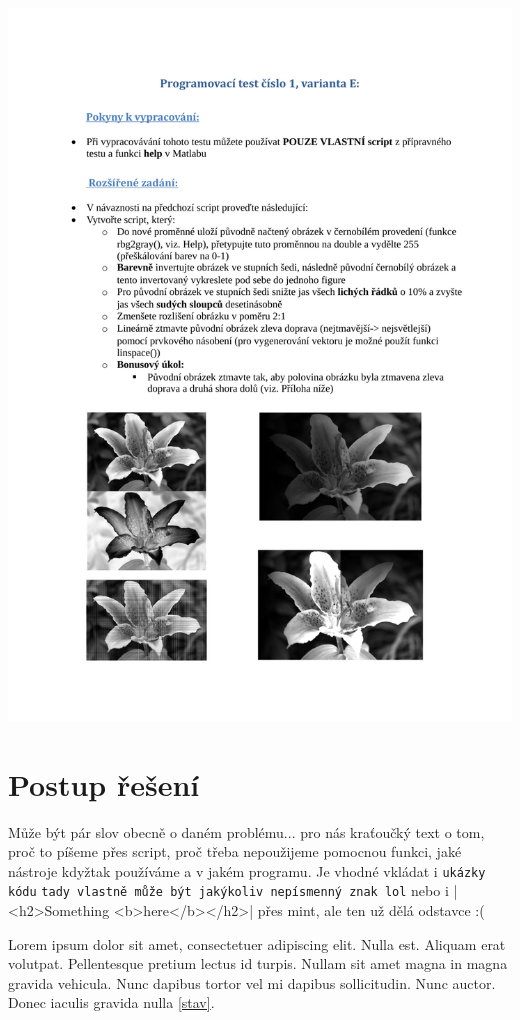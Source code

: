 \documentclass{article}
\begin{document}
\begin{center}
\includegraphics[scale=0.73]{./pdfs/Programovaci_test_1_rozsireny.pdf}
\end{center}

\newpage
\section{Postup řešení}
\par Může být pár slov obecně o daném problému... pro nás kraťoučký text o tom, proč to píšeme přes script, proč třeba nepoužijeme pomocnou funkci, jaké nástroje kdyžtak používáme a v jakém programu. Je vhodné vkládat i \verb|ukázky kódu| \verb^tady vlastně může být jakýkoliv nepísmenný znak lol^ nebo i |<h2>Something <b>here</b></h2>| přes mint, ale ten už dělá odstavce :(
\par Lorem ipsum dolor sit amet, consectetuer adipiscing elit. Nulla est. Aliquam erat volutpat. Pellentesque pretium lectus id turpis. Nullam sit amet magna in magna gravida vehicula. Nunc dapibus tortor vel mi dapibus sollicitudin. Nunc auctor. Donec iaculis gravida nulla \eqref{stav}.
\end{document}
